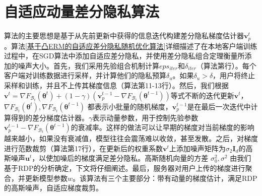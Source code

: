 \section{自适应动量差分隐私算法}
算法的主要思想是基于从先前更新中获得的信息迭代构建差分隐私梯度估计器$\mathbf{v}_{p}^{t}$。算法\ref{基于凸ERM的自适应差分隐私随机优化算法}详细描述了在本地客户端训练过程中，在SGD算法中添加自适应差分隐私，并使用差分隐私组合定理衡量所添加的噪声大小。首先，我们采用先验组合机制计算$eps_{iter}$和$\delta_{iter}$（算法第行）。每个客户端对训练数据进行采样，并计算他们的隐私预算$\delta_{u}$。如果$\delta_{u}>\delta$，用户将终止采样和训练，并且不上传其梯度信息（算法第11-13行）。然后，我们根据$\mathbf{v}^{t}=\nabla F_{\mathcal{B}_{t}}\left(\boldsymbol{\theta}^{t}\right)+(1-\gamma)\left(\mathbf{v}_{p}^{t-1}-\nabla F_{\mathcal{B}_{t}}\left(\boldsymbol{\theta}^{t-1}\right)\right)$等式不断的迭代更新$\mathbf{v}^{t}$，$\nabla F_{\mathcal{B}_{t}}\left(\boldsymbol{\theta}^{t}\right), \nabla F_{\mathcal{B}_{t}}\left(\boldsymbol{\theta}^{t-1}\right)$ 都表示小批量的随机梯度，$\mathbf{v}_{p}^{t-1}$是在最后一次迭代中计算得到的差分梯度估计器。$\gamma$表示动量参数，用于控制先验参数$\mathbf{v}_{p}^{t-1}-\nabla F_{\mathcal{B}_{t}}\left(\boldsymbol{\theta}^{t-1}\right)$的衰减率。这样的做法可以让早期的梯度对当前梯度的影响越来越小，如果没有衰减值，模型往往会震荡难以收敛，甚至发散。之后，对梯度进行范数裁剪（算法第17行），在更新后的权重系数$\mathbf{v}^{t}$上添加噪声矩阵为$\sigma_{2} \mathbf{I}_{d}$的高斯噪声$\mathbf{u}^{t}$，以使加噪后的梯度满足差分隐私。高斯随机向量的方差 $\sigma_{0}^{2}, \sigma^{2}$ 由我们基于RDP的分析确定，下文将仔细阐述。最后，服务器对用户上传的梯度进行聚合，并更新模型参数$w$。该算法有三个主要部分：带有动量的梯度估计，满足RDP的高斯噪声，自适应梯度裁剪。

